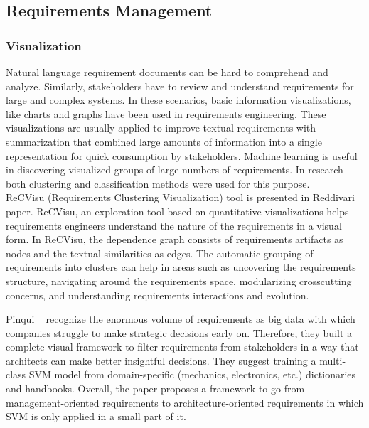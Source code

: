 \subsection{Requirements Management}

\subsubsection{Visualization}

Natural language requirement documents can be hard to comprehend and analyze. Similarly, stakeholders have to review and understand requirements for large and complex systems.  In these scenarios, basic information visualizations, like charts and graphs have been used in requirements engineering. These visualizations are usually applied to improve textual requirements with summarization that combined large amounts of information into a single representation for quick consumption by stakeholders\cite{Reddivari:2012}. Machine learning is useful in discovering visualized groups of large numbers of requirements. In research both clustering and classification methods were used for this purpose.\\

ReCVisu (Requirements Clustering Visualization) tool is presented in Reddivari
\etal~\cite{Reddivari:2012} paper. ReCVisu, an exploration tool based on
quantitative visualizations helps requirements engineers understand the nature
of the requirements in a visual form. In ReCVisu, the dependence graph consists
of requirements artifacts as nodes and the textual similarities as edges. The
automatic grouping of requirements into clusters can help in areas such as
uncovering the requirements structure, navigating around the requirements space,
modularizing crosscutting concerns, and understanding requirements interactions
and evolution.

	Pinqui \etal~\cite{Pinqui:2015} recognize the enormous volume of requirements as
big data with which companies struggle to make strategic decisions early on.
Therefore, they built a complete visual framework to filter requirements from
stakeholders in a way that architects can make better insightful decisions. They
suggest training a multi-class SVM model from domain-specific (mechanics,
electronics, etc.) dictionaries and handbooks. Overall, the paper proposes a
framework to go from management-oriented requirements to architecture-oriented
requirements in which SVM is only applied in a small part of it.

